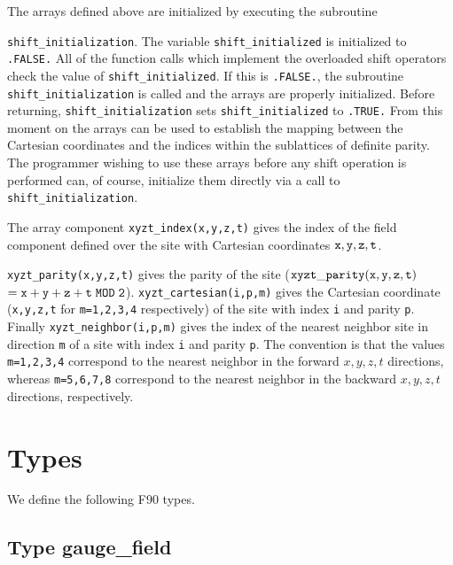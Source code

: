 The arrays defined above are initialized by executing the subroutine

{\parindent=0pt {\tt shift\_initialization}.  
The variable {\tt shift\_initialized}
is initialized to {\tt .FALSE.}  All of the function calls
which implement the overloaded shift operators check the value
of  {\tt shift\_initialized}.  If this is {\tt .FALSE.}, the
subroutine {\tt shift\_initialization} is called and the arrays are 
properly initialized.  Before returning, {\tt shift\_initialization} sets
{\tt shift\_initialized} to {\tt .TRUE.}  From this moment on
the arrays can be used to establish the mapping between the
Cartesian coordinates and the indices within the sublattices
of definite parity.  The programmer wishing to use these arrays
before any shift operation is performed can, of course, initialize
them directly via a call to {\tt shift\_initialization}. }

The array component {\tt xyzt\_index(x,y,z,t)} gives the index of the
field component defined over the site with Cartesian coordinates
$\tt x,y,z,t$. 

{\parindent=0pt  {\tt xyzt\_parity(x,y,z,t)} gives the parity of the
site ($\tt xyzt\_parity(x,y,z,t)$
$\tt  = x+y+z+t\;  MOD \; 2$).
{\tt xyzt\_cartesian(i,p,m)} gives the Cartesian coordinate ({\tt x,y,z,t}
for {\tt m=1,2,3,4} respectively) of the site with index {\tt i} and 
parity {\tt p}. Finally {\tt xyzt\_neighbor(i,p,m)} gives the index
of the nearest neighbor site in direction {\tt m} of a site with index
{\tt i} and parity {\tt p}.  The convention is that the
values {\tt m=1,2,3,4}
correspond to the nearest neighbor in the forward $x,y,z,t$ 
directions, whereas {\tt m=5,6,7,8} correspond to the 
nearest neighbor in the backward $x,y,z,t$ directions, respectively.}
 
\section{Types}
\label{types}

We define the following F90 types.

\subsection{Type gauge\_field}
\label{typeg}

\vskip 4mm
{\baselineskip 5mm \tt
{}
}

